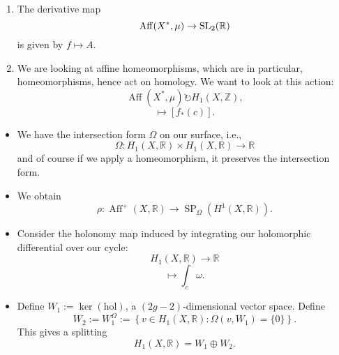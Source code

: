 \documentclass[reqno]{amsart} 
\numberwithin{theorem}{section}
\numberwithin{equation}{section}
\begin{document}
\begin{remark}
  \begin{enumerate}
  \item The derivative map
    \begin{equation*}
      \operatorname{Aff}(X^\ast, \mu) \rightarrow \operatorname{SL}_2(\mathbb{R})
    \end{equation*}
    is given by $f \mapsto A$.
  \item We are looking at affine homeomorphisms, which are in particular, homeomorphisms, hence act on homology.  We want to look at this action:
    \begin{equation*}
      \operatorname{Aff}(X^\ast, \mu) \circlearrowright H_1(X, \mathbb{Z}),
    \end{equation*}
    \begin{equation*}
      [c] \mapsto[f_\ast(c)].
    \end{equation*}
  \end{enumerate}
\end{remark}
\begin{fact}
  \begin{itemize}
  \item We have the intersection form $\Omega$ on our surface, i.e.,
    \begin{equation*}
      \Omega : H_1(X, \mathbb{R}) \times H_1(X, \mathbb{R}) \rightarrow \mathbb{R}
    \end{equation*}
    and of course if we apply a homeomorphism, it preserves the intersection form.
  \item We obtain
    \begin{equation*}
      \rho : \operatorname{Aff}^+(X, \mathbb{R}) \rightarrow \operatorname{SP}_\Omega(H^1(X, \mathbb{R})).
    \end{equation*}
  \item Consider the holonomy map induced by integrating our holomorphic differential over our cycle:
    \begin{equation*}
      H_1(X, \mathbb{R}) \rightarrow \mathbb{R}
    \end{equation*}
    \begin{equation*}
      [c] \mapsto \int_c \omega.
    \end{equation*}
  \item Define $W_1 := \ker(\mathrm{hol})$, a $(2 g -2)$-dimensional vector space.  Define
    \begin{equation*}
      W_2 := W_1^\Omega := \left\{ v \in H_1(X, \mathbb{R}) : \Omega(v, W_1) = \{0\} \right\}.
    \end{equation*}
    This gives a splitting
    \begin{equation*}
      H_1(X, \mathbb{R}) = W_1 \oplus W_2.
    \end{equation*}
  \end{itemize}
\end{fact}
\end{document}
